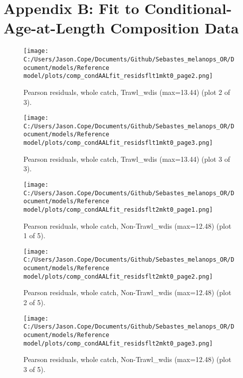 \documentclass[11pt,
  english,
  letterpaper,
]{article}
\begin{document}
\clearpage

\hypertarget{app-b}{%
\section{Appendix B: Fit to Conditional-Age-at-Length Composition Data}\label{app-b}}

\begin{figure}
\centering
\texttt{[image: C:/Users/Jason.Cope/Documents/Github/Sebastes\_melanops\_OR/Document/models/Reference model/plots/comp\_condAALfit\_residsflt1mkt0\_page2.png]}
\caption{Pearson residuals, whole catch, Trawl\_wdis (max=13.44) (plot 2 of 3).\label{fig:comp_condAALfit_residsflt1mkt0_page2}}
\end{figure}

\begin{figure}
\centering
\texttt{[image: C:/Users/Jason.Cope/Documents/Github/Sebastes\_melanops\_OR/Document/models/Reference model/plots/comp\_condAALfit\_residsflt1mkt0\_page3.png]}
\caption{Pearson residuals, whole catch, Trawl\_wdis (max=13.44) (plot 3 of 3).\label{fig:comp_condAALfit_residsflt1mkt0_page3}}
\end{figure}

\begin{figure}
\centering
\texttt{[image: C:/Users/Jason.Cope/Documents/Github/Sebastes\_melanops\_OR/Document/models/Reference model/plots/comp\_condAALfit\_residsflt2mkt0\_page1.png]}
\caption{Pearson residuals, whole catch, Non-Trawl\_wdis (max=12.48) (plot 1 of 5).\label{fig:comp_condAALfit_residsflt2mkt0_page1}}
\end{figure}

\begin{figure}
\centering
\texttt{[image: C:/Users/Jason.Cope/Documents/Github/Sebastes\_melanops\_OR/Document/models/Reference model/plots/comp\_condAALfit\_residsflt2mkt0\_page2.png]}
\caption{Pearson residuals, whole catch, Non-Trawl\_wdis (max=12.48) (plot 2 of 5).\label{fig:comp_condAALfit_residsflt2mkt0_page2}}
\end{figure}

\begin{figure}
\centering
\texttt{[image: C:/Users/Jason.Cope/Documents/Github/Sebastes\_melanops\_OR/Document/models/Reference model/plots/comp\_condAALfit\_residsflt2mkt0\_page3.png]}
\caption{Pearson residuals, whole catch, Non-Trawl\_wdis (max=12.48) (plot 3 of 5).\label{fig:comp_condAALfit_residsflt2mkt0_page3}}
\end{figure}
\end{document}
